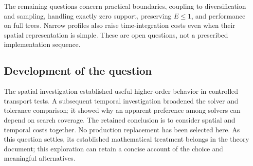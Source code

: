 \documentclass[11pt]{article}
\begin{document}
The remaining questions concern practical boundaries, coupling to diversification and sampling,
handling exactly zero support, preserving $E\leq1$, and performance on full trees. Narrow profiles
also raise time-integration costs even when their spatial representation is simple. These are open
questions, not a prescribed implementation sequence.

\subsection{Development of the question}
The spatial investigation established useful higher-order behavior in controlled transport tests.
A subsequent temporal investigation broadened the solver and tolerance comparison; it showed why
an apparent preference among solvers can depend on search coverage. The retained conclusion is to
consider spatial and temporal costs together. No production replacement has been selected here.
As this question settles, its established mathematical treatment belongs in the theory document;
this exploration can retain a concise account of the choice and meaningful alternatives.
\end{document}
